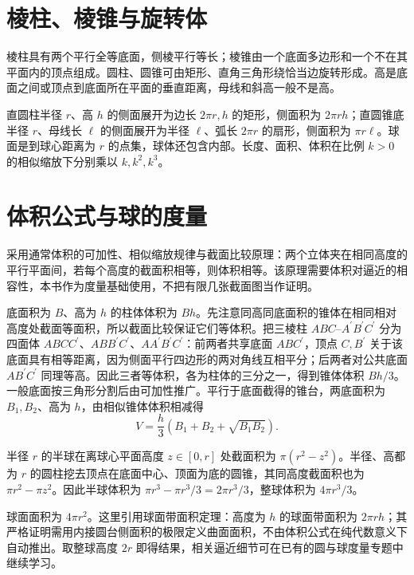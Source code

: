 \documentclass[UTF8]{ctexbook}
\begin{document}
\section{棱柱、棱锥与旋转体}
棱柱具有两个平行全等底面，侧棱平行等长；棱锥由一个底面多边形和一个不在其平面内的顶点组成。圆柱、圆锥可由矩形、直角三角形绕恰当边旋转形成。高是底面之间或顶点到底面所在平面的垂直距离，母线和斜高一般不是高。

直圆柱半径 $r$、高 $h$ 的侧面展开为边长 $2\pi r,h$ 的矩形，侧面积为 $2\pi rh$；直圆锥底半径 $r$、母线长 $\ell$ 的侧面展开为半径 $\ell$、弧长 $2\pi r$ 的扇形，侧面积为 $\pi r\ell$。球面是到球心距离为 $r$ 的点集，球体还包含内部。长度、面积、体积在比例 $k>0$ 的相似缩放下分别乘以 $k,k^2,k^3$。

\section{体积公式与球的度量}
采用通常体积的可加性、相似缩放规律与截面比较原理：两个立体夹在相同高度的平行平面间，若每个高度的截面积相等，则体积相等。该原理需要体积对逼近的相容性，本书作为度量基础使用，不把有限几张截面图当作证明。

底面积为 $B$、高为 $h$ 的柱体体积为 $Bh$。先注意同高同底面积的锥体在相同相对高度处截面等面积，所以截面比较保证它们等体积。把三棱柱 $ABC$--$A^{\prime}B^{\prime}C^{\prime}$ 分为四面体 $ABCC^{\prime}$、$ABB^{\prime}C^{\prime}$、$AA^{\prime}B^{\prime}C^{\prime}$：前两者共享底面 $ABC^{\prime}$，顶点 $C,B^{\prime}$ 关于该底面具有相等距离，因为侧面平行四边形的两对角线互相平分；后两者对公共底面 $AB^{\prime}C^{\prime}$ 同理等高。因此三者等体积，各为柱体的三分之一，得到锥体体积 $Bh/3$。一般底面按三角形分割后由可加性推广。平行于底面截得的锥台，两底面积为 $B_1,B_2$、高为 $h$，由相似锥体体积相减得
\[
 V=\frac h3(B_1+B_2+\sqrt{B_1B_2}).
\]

半径 $r$ 的半球在离球心平面高度 $z\in[0,r]$ 处截面积为 $\pi(r^2-z^2)$。半径、高都为 $r$ 的圆柱挖去顶点在底面中心、顶面为底的圆锥，其同高度截面积也为 $\pi r^2-\pi z^2$。因此半球体积为 $\pi r^3-\pi r^3/3=2\pi r^3/3$，整球体积为 $4\pi r^3/3$。

球面面积为 $4\pi r^2$。这里引用球面带面积定理：高度为 $h$ 的球面带面积为 $2\pi rh$；其严格证明需用内接圆台侧面积的极限定义曲面面积，不由体积公式在纯代数意义下自动推出。取整球高度 $2r$ 即得结果，相关逼近细节可在已有的圆与球度量专题中继续学习。
\end{document}
